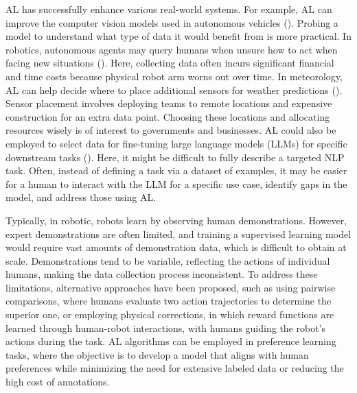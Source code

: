 \documentclass[
  letterpaper,
  numbers=noenddot,
  DIV=11]{scrreprt}
\theoremstyle{plain}
\theoremstyle{definition}
\theoremstyle{remark}
\begin{document}
AL has successfully enhance various real-world systems. For example, AL
can improve the computer vision models used in autonomous vehicles
(). Probing a model to
understand what type of data it would benefit from is more practical. In
robotics, autonomous agents may query humans when unsure how to act when
facing new situations (). Here, collecting data often incurs significant
financial and time costs because physical robot arm worns out over time.
In meteorology, AL can help decide where to place additional sensors for
weather predictions (). Sensor placement involves deploying teams to remote
locations and expensive construction for an extra data point. Choosing
these locations and allocating resources wisely is of interest to
governments and businesses. AL could also be employed to select data for
fine-tuning large language models (LLMs) for specific downstream tasks
(). Here, it might be
difficult to fully describe a targeted NLP task. Often, instead of
defining a task via a dataset of examples, it may be easier for a human
to interact with the LLM for a specific use case, identify gaps in the
model, and address those using AL.

Typically, in robotic, robots learn by observing human demonstrations.
However, expert demonstrations are often limited, and training a
supervised learning model would require vast amounts of demonstration
data, which is difficult to obtain at scale. Demonstrations tend to be
variable, reflecting the actions of individual humans, making the data
collection process inconsistent. To address these limitations,
alternative approaches have been proposed, such as using pairwise
comparisons, where humans evaluate two action trajectories to determine
the superior one, or employing physical corrections, in which reward
functions are learned through human-robot interactions, with humans
guiding the robot's actions during the task. AL algorithms can be
employed in preference learning tasks, where the objective is to develop
a model that aligns with human preferences while minimizing the need for
extensive labeled data or reducing the high cost of annotations.
\end{document}
